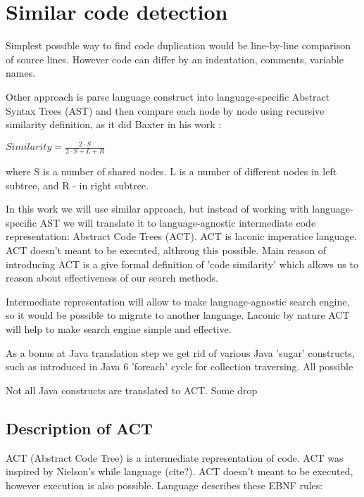 \section{Similar code detection}

Simplest possible way to find code duplication would be line-by-line comparison of
source lines. However code can differ by an indentation, comments, variable
names. 

Other approach is parse language construct into language-specific Abstract 
Syntax Trees (AST) and then compare each node by node using recursive similarity
definition, as it did Baxter in his work \cite{Baxter&al1998}:

\begin{math}
Similarity =  \frac{ 2 \cdot S}{2 \cdot S + L + R}
\end{math}

where S is a number of shared nodes. L is a number of different nodes in left subtree,
and R - in right subtree.

In this work we will use similar approach, but instead of working with
language-specific AST we will translate it to language-agnostic intermediate
code representation: Abstract Code Trees (ACT).  ACT is laconic imperatice 
language. ACT doesn't meant to be executed, althroug this possible. Main reason
of introducing ACT is a give formal definition of 'code similarity' which allows
us to reason about effectiveness of our search methods. 

Intermediate representation will allow to make language-agnostic search engine, so it would be possible to migrate to
another language. Laconic by nature ACT will help to make search engine simple
and effective. 

As a bonus at Java translation step we get rid of various Java 'sugar' constructs,
such as introduced in Java 6 'foreach' cycle for collection traversing. All possible 

Not all Java constructs are translated to ACT. Some drop

\subsection{Description of ACT}

ACT (Abstract Code Tree) is a intermediate representation of code. ACT was inspired
by Nielson's while language (cite?). ACT doesn't meant to be executed, however
execution is also possible. Language describes these EBNF rules:

